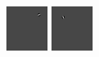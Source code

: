 \begin{figure}[ht]
 \includegraphics[width=\textwidth*11/100]{ch5/figures/firstgabor_Scaling_6.png}
 \includegraphics[width=\textwidth*11/100]{ch5/figures/firstgabor_Scaling_7.png}

\end{figure}
